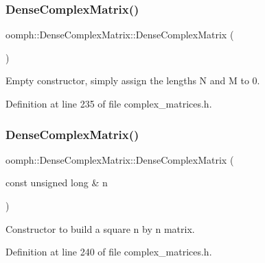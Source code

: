 \subsubsection{\texorpdfstring{Dense\+Complex\+Matrix()}{DenseComplexMatrix()}\hspace{0.1cm}{\footnotesize\ttfamily [1/6]}}
{\footnotesize\ttfamily oomph\+::\+Dense\+Complex\+Matrix\+::\+Dense\+Complex\+Matrix (\begin{DoxyParamCaption}{ }\end{DoxyParamCaption})\hspace{0.3cm}{\ttfamily [inline]}}



Empty constructor, simply assign the lengths N and M to 0. 



Definition at line 235 of file complex\+\_\+matrices.\+h.

\mbox{\label{classoomph_1_1DenseComplexMatrix_ac716f53db14021238edef4e385f6b319}} 
\subsubsection{\texorpdfstring{Dense\+Complex\+Matrix()}{DenseComplexMatrix()}\hspace{0.1cm}{\footnotesize\ttfamily [2/6]}}
{\footnotesize\ttfamily oomph\+::\+Dense\+Complex\+Matrix\+::\+Dense\+Complex\+Matrix (\begin{DoxyParamCaption}\item[{const unsigned long \&}]{n }\end{DoxyParamCaption})\hspace{0.3cm}{\ttfamily [inline]}}



Constructor to build a square n by n matrix. 



Definition at line 240 of file complex\+\_\+matrices.\+h.

\mbox{\label{classoomph_1_1DenseComplexMatrix_ab17bdf75fb6cec1bbae74a0abac8e69a}} 
